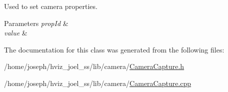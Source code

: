 Used to set camera properties. 


\begin{DoxyParams}{Parameters}
{\em prop\+Id} & \\
\hline
{\em value} & \\
\hline
\end{DoxyParams}


The documentation for this class was generated from the following files\+:\begin{DoxyCompactItemize}
\item 
/home/joseph/hviz\+\_\+joel\+\_\+ss/lib/camera/\hyperlink{CameraCapture_8h}{Camera\+Capture.\+h}\item 
/home/joseph/hviz\+\_\+joel\+\_\+ss/lib/camera/\hyperlink{CameraCapture_8cpp}{Camera\+Capture.\+cpp}\end{DoxyCompactItemize}
